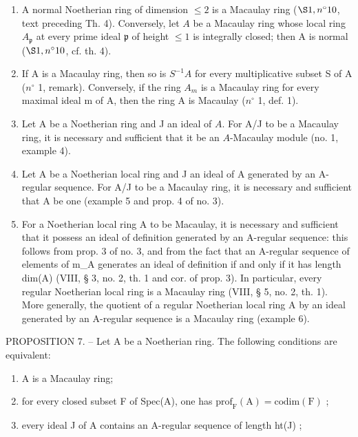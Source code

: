 \begin{enumerate}
\def\labelenumi{\arabic{enumi})}
\setcounter{enumi}{2}
\item
  A normal Noetherian ring of dimension \(\leqslant 2\) is a Macaulay ring (\(\S 1, n^{\circ} 10\), text preceding Th. 4). Conversely, let \(A\) be a Macaulay ring whose local ring \(A_{\mathfrak{p}}\) at every prime ideal \(\mathfrak{p}\) of height \(\leqslant 1\) is integrally closed; then A is normal (\(\S 1, n^{\circ} 10\), cf. th. 4).
\item
  If A is a Macaulay ring, then so is \(S^{-1}A\) for every multiplicative subset S of A (\(n^{\circ}\) 1, remark). Conversely, if the ring \(A_{m}\) is a Macaulay ring for every maximal ideal m of A, then the ring A is Macaulay (\(n^{\circ}\) 1, def. 1).
\item
  Let A be a Noetherian ring and J an ideal of \(A\). For A/J to be a Macaulay ring, it is necessary and sufficient that it be an \(A\)-Macaulay module (no. 1, example 4).
\item
  Let A be a Noetherian local ring and J an ideal of A generated by an A-regular sequence. For A/J to be a Macaulay ring, it is necessary and sufficient that A be one (example 5 and prop. 4 of no. 3).
\item
  For a Noetherian local ring A to be Macaulay, it is necessary and sufficient that it possess an ideal of definition generated by an A-regular sequence: this follows from prop. 3 of no. 3, and from the fact that an A-regular sequence of elements of m\_A generates an ideal of definition if and only if it has length dim(A) (VIII, § 3, no. 2, th. 1 and cor. of prop. 3). In particular, every regular Noetherian local ring is a Macaulay ring (VIII, § 5, no. 2, th. 1). More generally, the quotient of a regular Noetherian local ring A by an ideal generated by an A-regular sequence is a Macaulay ring (example 6).
\end{enumerate}

PROPOSITION 7. -- Let A be a Noetherian ring. The following conditions are equivalent:

\begin{enumerate}
\def\labelenumi{(\roman{enumi})}
\item
  A is a Macaulay ring;
\item
  for every closed subset F of Spec(A), one has \(\mathrm{prof}_{\mathrm{F}}(\mathrm{A}) = \mathrm{codim}(\mathrm{F})\) ;
\item
  every ideal J of A contains an A-regular sequence of length ht(J) ;
\end{enumerate}

